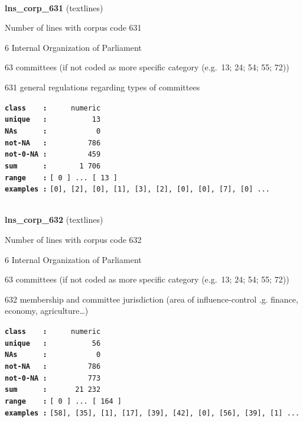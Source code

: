\documentclass[]{article}
\begin{document}
~

\textbf{lns\_corp\_631} (textlines)

Number of lines with corpus code 631

6 Internal Organization of Parliament

63 committees (if not coded as more specific category (e.g.~13; 24; 54;
55; 72))

631 general regulations regarding types of committees

\textbf{\texttt{class\ \ \ \ :}} \texttt{~~~~~numeric}\\
\textbf{\texttt{unique\ \ \ :}} \texttt{~~~~~~~~~~13}\\
\textbf{\texttt{NAs\ \ \ \ \ \ :}} \texttt{~~~~~~~~~~~0}\\
\textbf{\texttt{not-NA\ \ \ :}} \texttt{~~~~~~~~~786}\\
\textbf{\texttt{not-0-NA\ :}} \texttt{~~~~~~~~~459}\\
\textbf{\texttt{sum\ \ \ \ \ \ :}} \texttt{~~~~~~~1~706}\\
\textbf{\texttt{range\ \ \ \ :}}
\texttt{{[}\ 0\ {]}\ ...\ {[}\ 13\ {]}}\\
\textbf{\texttt{examples\ :}}
\texttt{{[}0{]},\ {[}2{]},\ {[}0{]},\ {[}1{]},\ {[}3{]},\ {[}2{]},\ {[}0{]},\ {[}0{]},\ {[}7{]},\ {[}0{]}\ ...}\\

~

\textbf{lns\_corp\_632} (textlines)

Number of lines with corpus code 632

6 Internal Organization of Parliament

63 committees (if not coded as more specific category (e.g.~13; 24; 54;
55; 72))

632 membership and committee jurisdiction (area of influence-control .g.
finance, economy, agriculture\ldots{})

\textbf{\texttt{class\ \ \ \ :}} \texttt{~~~~~numeric}\\
\textbf{\texttt{unique\ \ \ :}} \texttt{~~~~~~~~~~56}\\
\textbf{\texttt{NAs\ \ \ \ \ \ :}} \texttt{~~~~~~~~~~~0}\\
\textbf{\texttt{not-NA\ \ \ :}} \texttt{~~~~~~~~~786}\\
\textbf{\texttt{not-0-NA\ :}} \texttt{~~~~~~~~~773}\\
\textbf{\texttt{sum\ \ \ \ \ \ :}} \texttt{~~~~~~21~232}\\
\textbf{\texttt{range\ \ \ \ :}}
\texttt{{[}\ 0\ {]}\ ...\ {[}\ 164\ {]}}\\
\textbf{\texttt{examples\ :}}
\texttt{{[}58{]},\ {[}35{]},\ {[}1{]},\ {[}17{]},\ {[}39{]},\ {[}42{]},\ {[}0{]},\ {[}56{]},\ {[}39{]},\ {[}1{]}\ ...}\\
\end{document}
